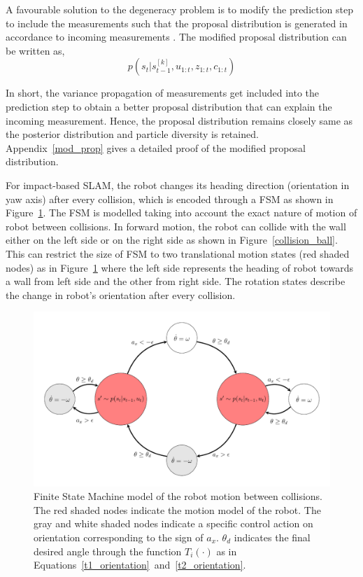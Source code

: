 A favourable solution to the degeneracy problem is to modify the prediction step to include the measurements such that the proposal distribution is generated in accordance to incoming measurements \cite{montemerlo2007fastslam}. The modified proposal distribution can be written as,
\begin{equation}
p(s_t|s^{[k]}_{t-1},u_{1:t},z_{1:t},c_{1:t})
\end{equation}

In short, the variance propagation of measurements get included into the prediction step to obtain a better proposal distribution that can explain the incoming measurement. Hence, the proposal distribution remains closely same as the posterior distribution and particle diversity is retained. Appendix~\ref{mod_prop} gives a detailed proof of the modified proposal distribution.

For impact-based SLAM, the robot changes its heading direction (orientation in yaw axis) after every collision, which is encoded through a \acf{FSM} as shown in Figure~\ref{fsm4}. The FSM is modelled taking into account the exact nature of motion of robot between collisions. In forward motion, the robot can collide with the wall either on the left side or on the right side as shown in Figure~\ref{collision_ball}. This can restrict the size of FSM to two translational motion states (red shaded nodes) as in Figure~\ref{fsm4} where the left side represents the heading of robot towards a wall from left side and the other from right side. The rotation states describe the change in robot's orientation after every collision.

\begin{figure}
\centering
\includegraphics[scale=0.75]{./images/fsm4}
\caption[Finite State Machine model of robot-wall collisions]{Finite State Machine model of the robot motion between collisions. The red shaded nodes indicate the motion model of the robot. The gray and white shaded nodes indicate a specific control action on orientation corresponding to the sign of $a_x$. $\theta_d$ indicates the final desired angle through the function $T_i(\cdot)$ as in Equations~\ref{t1_orientation}~and~\ref{t2_orientation}.}
\label{fsm4}
\end{figure}

